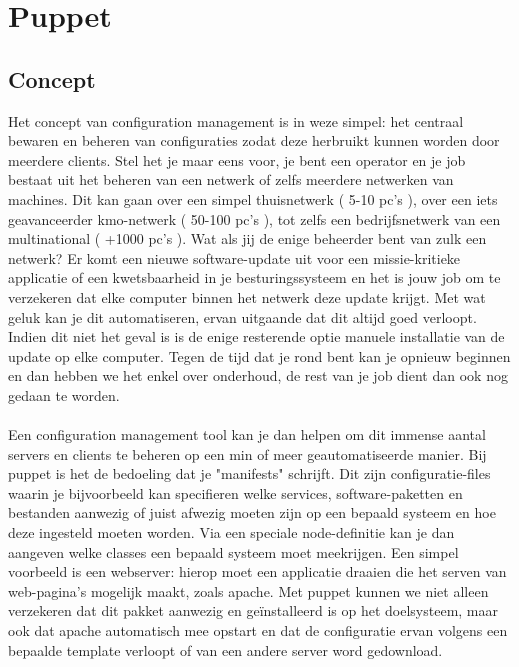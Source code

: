 \chapter{Puppet}

\section{Concept}
Het concept van configuration management is in weze simpel: het centraal bewaren en beheren van configuraties zodat deze herbruikt kunnen worden door meerdere clients. Stel het je maar eens voor, je bent een operator en je job bestaat uit het beheren van een netwerk of zelfs meerdere netwerken van machines. Dit kan gaan over een simpel thuisnetwerk ( 5-10 pc's ), over een iets geavanceerder kmo-netwerk ( 50-100 pc's ), tot zelfs een bedrijfsnetwerk van een multinational ( +1000 pc's ). Wat als jij de enige beheerder bent van zulk een netwerk? Er komt een nieuwe software-update uit voor een missie-kritieke applicatie of een kwetsbaarheid in je besturingssysteem en het is jouw job om te verzekeren dat elke computer binnen het netwerk deze update krijgt. Met wat geluk kan je dit automatiseren, ervan uitgaande dat dit altijd goed verloopt. Indien dit niet het geval is is de enige resterende optie manuele installatie van de update op elke computer. Tegen de tijd dat je rond bent kan je opnieuw beginnen en dan hebben we het enkel over onderhoud, de rest van je job dient dan ook nog gedaan te worden.\\\\
%
Een configuration management tool kan je dan helpen om dit immense aantal servers en clients te beheren op een min of meer geautomatiseerde manier. Bij puppet is het de bedoeling dat je "manifests" schrijft. Dit zijn configuratie-files waarin je bijvoorbeeld kan specifieren welke services, software-paketten en bestanden aanwezig of juist afwezig moeten zijn op een bepaald systeem en hoe deze ingesteld moeten worden. Via een speciale node-definitie kan je dan aangeven welke classes een bepaald systeem moet meekrijgen. Een simpel voorbeeld is een webserver: hierop moet een applicatie draaien die het serven van web-pagina's mogelijk maakt, zoals apache. Met puppet kunnen we niet alleen verzekeren dat dit pakket aanwezig en ge\"installeerd is op het doelsysteem, maar ook dat apache automatisch mee opstart en dat de configuratie ervan volgens een bepaalde template verloopt of van een andere server word gedownload.\\\\

